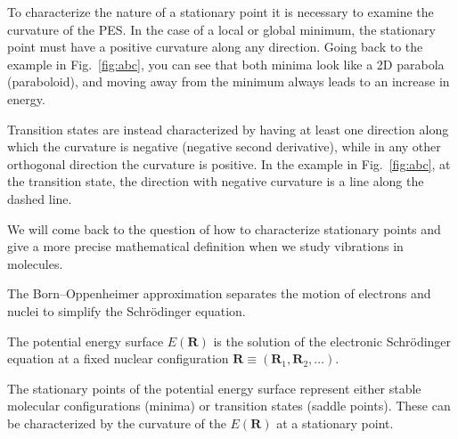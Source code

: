 \documentclass[../Main/notes.tex]{subfiles}
\begin{document}
To characterize the nature of a stationary point it is necessary to examine the curvature of the PES.
In the case of a local or global minimum, the stationary point must have a positive curvature along any direction.
Going back to the example in Fig.~\ref{fig:abc}, you can see that both minima look like a 2D parabola (paraboloid), and moving away from the minimum always leads to an increase in energy.

Transition states are instead characterized by having at least one direction along which the curvature is negative (negative second derivative), while in any other orthogonal direction the curvature is positive.
In the example in Fig.~\ref{fig:abc}, at the transition state, the direction with negative curvature is a line along the dashed line.

We will come back to the question of how to characterize stationary points and give a more precise mathematical definition when we study vibrations in molecules.

\begin{summary}
\item The Born--Oppenheimer approximation separates the motion of electrons and nuclei to simplify the Schr\"{o}dinger equation.
\item The potential energy surface $E(\mathbf{R})$ is the solution of the electronic Schr\"{o}dinger equation at a fixed nuclear configuration $ \mathbf{R} \equiv (\mathbf{R}_1,\mathbf{R}_2,\ldots)$.
\item The stationary points of the potential energy surface represent either stable molecular configurations (minima) or transition states (saddle points). These can be characterized by the curvature of the $E(\mathbf{R})$ at a stationary point.
\end{summary}
\end{document}
